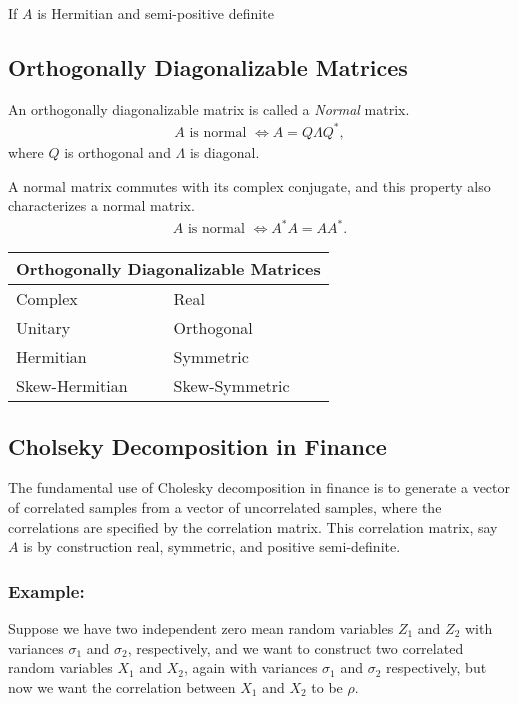 \documentclass{amsart}
\theoremstyle{plain}
\numberwithin{equation}{section}
\begin{document}
If $A$ is Hermitian and semi-positive definite
\subsection{Orthogonally Diagonalizable Matrices}
An orthogonally diagonalizable matrix is called
a \emph{Normal} matrix. 
\begin{align*}
A \text{ is normal } \Leftrightarrow A = Q\Lambda Q^*,
\end{align*}
where $Q$ is orthogonal and $\Lambda$ is diagonal.

A normal matrix commutes with its complex conjugate, and 
this property also characterizes a normal matrix.
\begin{align*}
A \text{ is normal } \Leftrightarrow A^*A = AA^*.
\end{align*}

\begin{center}
\begin{tabular}{ |p{3cm}|p{3cm}| }
 \hline
 \multicolumn{2}{|c|}{ Orthogonally Diagonalizable Matrices }\\
 \hline
 Complex & Real \\
 \hline
 Unitary  & Orthogonal\\
 Hermitian & Symmetric\\
 Skew-Hermitian & Skew-Symmetric \\
 \hline
\end{tabular}
\end{center}

\subsection{Cholseky Decomposition in Finance}
The fundamental use of Cholesky decomposition 
in finance is to generate a vector of correlated
samples from a vector of uncorrelated samples, where
the correlations are specified by the correlation 
matrix. This correlation matrix, say $A$ is by 
construction real, symmetric, and positive semi-definite.

\subsubsection{Example:}
Suppose we have two independent zero mean random variables 
$Z_1$ and $Z_2$ with variances $\sigma_1$ and $\sigma_2$, 
respectively, and we want to construct two correlated random variables
$X_1$ and $X_2$, again with variances $\sigma_1$ and $\sigma_2$ respectively,
but now we want the correlation between $X_1$ and $X_2$ to be $\rho$. 
\end{document}
